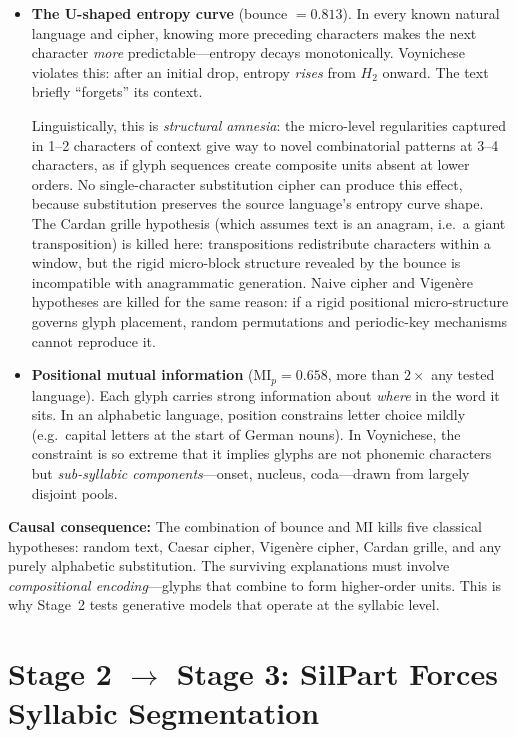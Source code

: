 \documentclass[11pt,a4paper]{article}
\newcommand{\MI}{\mathrm{MI}}
\begin{document}
\begin{itemize}[nosep]
\item \textbf{The U-shaped entropy curve} (bounce $= 0.813$).  In every known natural language and cipher, knowing more preceding characters makes the next character \emph{more} predictable---entropy decays monotonically.  Voynichese violates this: after an initial drop, entropy \emph{rises} from $H_2$ onward.  The text briefly ``forgets'' its context.

Linguistically, this is \textit{structural amnesia}: the micro-level regularities captured in 1--2 characters of context give way to novel combinatorial patterns at 3--4 characters, as if glyph sequences create composite units absent at lower orders.  No single-character substitution cipher can produce this effect, because substitution preserves the source language's entropy curve shape.  The Cardan grille hypothesis (which assumes text is an anagram, i.e.\ a giant transposition) is killed here: transpositions redistribute characters within a window, but the rigid micro-block structure revealed by the bounce is incompatible with anagrammatic generation.  Naive cipher and Vigen\`ere hypotheses are killed for the same reason: if a rigid positional micro-structure governs glyph placement, random permutations and periodic-key mechanisms cannot reproduce it.

\item \textbf{Positional mutual information} ($\MI_p = 0.658$, more than $2\times$ any tested language).  Each glyph carries strong information about \emph{where} in the word it sits.  In an alphabetic language, position constrains letter choice mildly (e.g.\ capital letters at the start of German nouns).  In Voynichese, the constraint is so extreme that it implies glyphs are not phonemic characters but \emph{sub-syllabic components}---onset, nucleus, coda---drawn from largely disjoint pools.
\end{itemize}

\noindent\textbf{Causal consequence:} The combination of bounce and MI kills five classical hypotheses: random text, Caesar cipher, Vigen\`ere cipher, Cardan grille, and any purely alphabetic substitution.  The surviving explanations must involve \emph{compositional encoding}---glyphs that combine to form higher-order units.  This is why Stage~2 tests generative models that operate at the syllabic level.


\section{Stage 2 $\to$ Stage 3: SilPart Forces Syllabic Segmentation}
\end{document}
